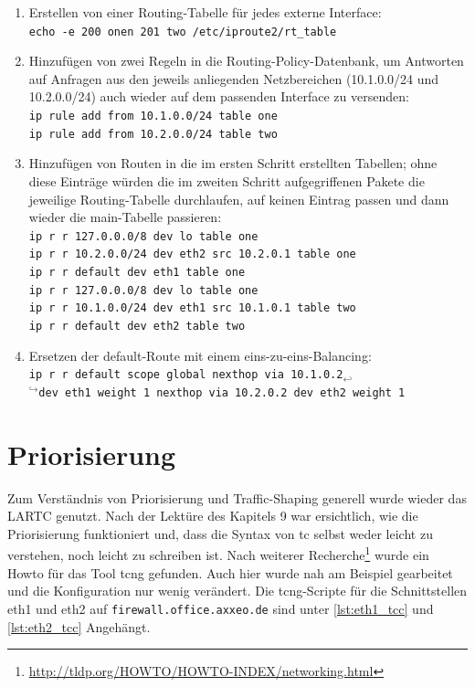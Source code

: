 \begin{enumerate}
 \item Erstellen von einer \gls{Routing}-Tabelle für jedes externe Interface:\\
    \texttt{echo -e {\tq}200 one{\bs}n 201 two{\tq} {\gt}{\gt} /etc/iproute2/rt\_table}
 \item Hinzufügen von zwei Regeln in die \gls{Routing}-\gls{Policy}-Datenbank, um Antworten auf Anfragen aus den jeweils anliegenden Netzbereichen (10.1.0.0/24 und 10.2.0.0/24) auch wieder auf dem passenden Interface zu versenden:\\
    \texttt{ip rule add from 10.1.0.0/24 table one\\ip rule add from 10.2.0.0/24 table two}
 \item Hinzufügen von Routen in die im ersten Schritt erstellten Tabellen; ohne diese Einträge würden die im zweiten Schritt aufgegriffenen Pakete die jeweilige Routing-Tabelle durchlaufen, auf keinen Eintrag passen und dann wieder die main-Tabelle passieren:\\
    \texttt{ip r r 127.0.0.0/8 dev lo table one\\ip r r 10.2.0.0/24 dev eth2 src 10.2.0.1 table one\\ip r r default dev eth1 table one\\
	ip r r 127.0.0.0/8 dev lo table one\\ip r r 10.1.0.0/24 dev eth1 src 10.1.0.1 table two\\ip r r default dev eth2 table two}
 \item Ersetzen der default-Route mit einem eins-zu-eins-Balancing:\\
    \texttt{ip r r default scope global nexthop via 10.1.0.2{$_{\hookleftarrow}$}\\ {$^{\hookrightarrow}$}dev eth1 weight 1 nexthop via 10.2.0.2 dev eth2 weight 1}
\end{enumerate}

\section{Priorisierung}
Zum Verständnis von Priorisierung und Traffic-Shaping generell wurde wieder das LARTC \citep{LARTC} genutzt. Nach der Lektüre des Kapitels 9 war ersichtlich, wie die Priorisierung funktioniert und, dass die Syntax von \gls{tc} selbst weder leicht zu verstehen, noch leicht zu schreiben ist. Nach weiterer Recherche\footnote{{\ua}\url{http://tldp.org/HOWTO/HOWTO-INDEX/networking.html}} wurde ein Howto für das Tool \gls{tcng} \citep{TCNGHTB} gefunden.
Auch hier wurde nah am Beispiel gearbeitet und die Konfiguration nur wenig verändert. Die \gls{tcng}-Scripte für die Schnittstellen eth1 und eth2 auf \texttt{firewall.office.axxeo.de} sind unter \vref{lst:eth1_tcc} und \vref{lst:eth2_tcc} Angehängt.

